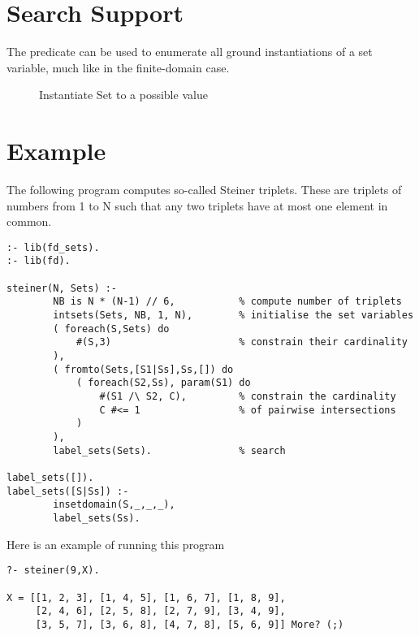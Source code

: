 \section{Search Support}

The
predicate can be used to enumerate all ground instantiations of a set
variable, much like
in the finite-domain case. 

\begin{description}
\item[]
         Instantiate Set to a possible value 
\end{description}


\section{Example}

The following program computes so-called Steiner triplets.
These are triplets of numbers from 1 to N such that
any two triplets have at most one element in common.
\begin{verbatim}
:- lib(fd_sets).
:- lib(fd).

steiner(N, Sets) :-
        NB is N * (N-1) // 6,           % compute number of triplets
        intsets(Sets, NB, 1, N),        % initialise the set variables
        ( foreach(S,Sets) do
            #(S,3)                      % constrain their cardinality
        ),
        ( fromto(Sets,[S1|Ss],Ss,[]) do
            ( foreach(S2,Ss), param(S1) do
                #(S1 /\ S2, C),         % constrain the cardinality
                C #<= 1                 % of pairwise intersections
            )
        ),
        label_sets(Sets).               % search

label_sets([]).
label_sets([S|Ss]) :-
        insetdomain(S,_,_,_),
        label_sets(Ss).
\end{verbatim}
Here is an example of running this program
\begin{verbatim}
?- steiner(9,X).

X = [[1, 2, 3], [1, 4, 5], [1, 6, 7], [1, 8, 9],
     [2, 4, 6], [2, 5, 8], [2, 7, 9], [3, 4, 9],
     [3, 5, 7], [3, 6, 8], [4, 7, 8], [5, 6, 9]] More? (;)
\end{verbatim}


